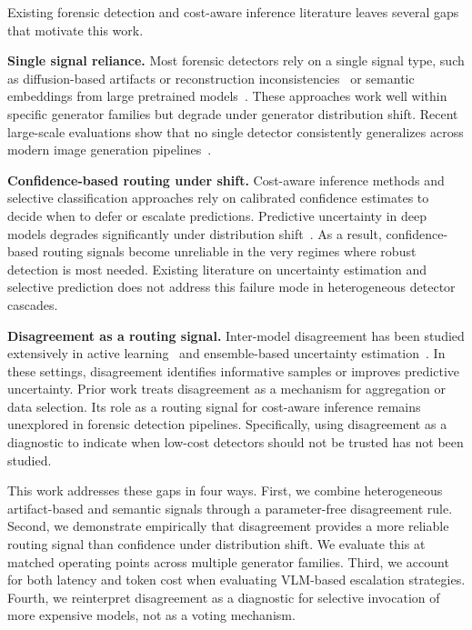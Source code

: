 \documentclass{ieeeaccess}
\begin{document}
Existing forensic detection and cost-aware inference literature leaves several gaps that motivate this work.

\textbf{Single signal reliance.} Most forensic detectors rely on a single signal type, such as diffusion-based artifacts or reconstruction inconsistencies~\cite{Corvi_2023_ICASSP} or semantic embeddings from large pretrained models~\cite{cozzolino2023raising}. These approaches work well within specific generator families but degrade under generator distribution shift. Recent large-scale evaluations show that no single detector consistently generalizes across modern image generation pipelines~\cite{epstein2023online, cozzolino2023raising}.

\textbf{Confidence-based routing under shift.} Cost-aware inference methods and selective classification approaches rely on calibrated confidence estimates to decide when to defer or escalate predictions. Predictive uncertainty in deep models degrades significantly under distribution shift~\cite{ovadia2019can}. As a result, confidence-based routing signals become unreliable in the very regimes where robust detection is most needed. Existing literature on uncertainty estimation and selective prediction does not address this failure mode in heterogeneous detector cascades.

\textbf{Disagreement as a routing signal.} Inter-model disagreement has been studied extensively in active learning~\cite{seung1992query} and ensemble-based uncertainty estimation~\cite{lakshminarayanan2017simple}. In these settings, disagreement identifies informative samples or improves predictive uncertainty. Prior work treats disagreement as a mechanism for aggregation or data selection. Its role as a routing signal for cost-aware inference remains unexplored in forensic detection pipelines. Specifically, using disagreement as a diagnostic to indicate when low-cost detectors should not be trusted has not been studied.

This work addresses these gaps in four ways. First, we combine heterogeneous artifact-based and semantic signals through a parameter-free disagreement rule. Second, we demonstrate empirically that disagreement provides a more reliable routing signal than confidence under distribution shift. We evaluate this at matched operating points across multiple generator families. Third, we account for both latency and token cost when evaluating VLM-based escalation strategies. Fourth, we reinterpret disagreement as a diagnostic for selective invocation of more expensive models, not as a voting mechanism.
\end{document}
